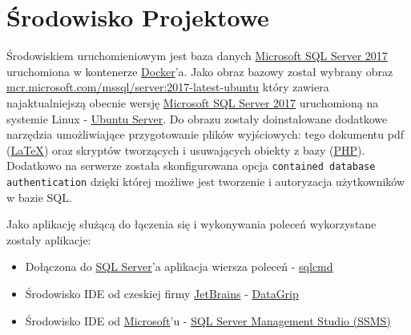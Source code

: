 \section{Środowisko Projektowe}

Środowiskiem uruchomieniowym jest baza danych \href{https://www.microsoft.com/pl-pl/sql-server/sql-server-2017}{Microsoft SQL Server 2017} uruchomiona w kontenerze \href{https://www.docker.com}{Docker}'a. Jako obraz bazowy został wybrany obraz \href{https://hub.docker.com/r/microsoft/mssql-server}{mcr.microsoft.com/mssql/server:2017-latest-ubuntu} który zawiera najaktualniejszą obecnie wersję \href{https://www.microsoft.com/pl-pl/sql-server/sql-server-2017}{Microsoft SQL Server 2017} uruchomioną na systemie Linux - \href{https://www.ubuntu.com/server}{Ubuntu Server}. Do obrazu zostały doinstalowane dodatkowe narzędzia umożliwiające przygotowanie plików wyjściowych: tego dokumentu pdf (\href{https://pl.wikipedia.org/wiki/LaTeX}{\LaTeX}) oraz skryptów tworzących i usuwających obiekty z bazy (\href{http://www.php.net}{PHP}). Dodatkowo na serwerze została skonfigurowana opcja \texttt{contained database authentication} dzięki której możliwe jest tworzenie i autoryzacja użytkowników w bazie SQL.

Jako aplikację służącą do łączenia się i wykonywania poleceń wykorzystane zostały aplikacje: 

\begin{itemize}
\item Dołączona do \href{https://www.microsoft.com/pl-pl/sql-server/sql-server-2017}{SQL Server}'a aplikacja wiersza poleceń - \href{https://docs.microsoft.com/en-us/sql/tools/sqlcmd-utility?view=sql-server-2017}{sqlcmd}
\item Środowisko IDE od czeskiej firmy \href{https://www.jetbrains.com/}{JetBrains} - \href{https://www.jetbrains.com/datagrip/}{DataGrip}
\item Środowisko IDE od \href{https://microsoft.com/}{Microsoft}'u - \href{https://docs.microsoft.com/en-us/sql/ssms/download-sql-server-management-studio-ssms?view=sql-server-2017}{SQL Server Management Studio (SSMS)}
\end{itemize}
